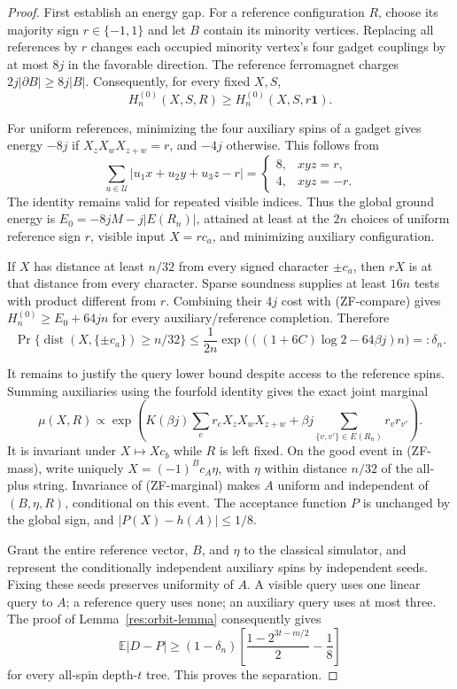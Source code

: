 \begin{proof}
First establish an energy gap.  For a reference configuration $R$,
choose its majority sign $r\in\{-1,1\}$ and let $B$ contain its
minority vertices.  Replacing all references by $r$ changes each
occupied minority vertex's four gadget couplings by at most $8j$ in
the favorable direction.  The reference ferromagnet charges
$2j|\partial B|\ge8j|B|$.  Consequently, for every fixed $X,S$,
\[
 H^{(0)}_n(X,S,R)\ge H^{(0)}_n(X,S,r\mathbf1).
 \tag{ZF-compare}
\]

For uniform references, minimizing the four auxiliary spins of a
gadget gives energy $-8j$ if $X_zX_wX_{z+w}=r$, and $-4j$ otherwise.
This follows from
\[
 \sum_{u\in\mathcal U}|u_1x+u_2y+u_3z-r|
 =\begin{cases}8,&xyz=r,\\4,&xyz=-r.\end{cases}
\]
The identity remains valid for repeated visible indices.  Thus the
global ground energy is
$E_0=-8jM-j|E(R_n)|$, attained at least at the $2n$ choices of
uniform reference sign $r$, visible input $X=r c_a$, and minimizing
auxiliary configuration.

If $X$ has distance at least $n/32$ from every signed character
$\pm c_a$, then $rX$ is at that distance from every character.
Sparse soundness supplies at least $16n$ tests with product different
from $r$.  Combining their $4j$ cost with (ZF-compare) gives
$H^{(0)}_n\ge E_0+64jn$ for every auxiliary/reference completion.
Therefore
\[
 \Pr\{\operatorname{dist}(X,\{\pm c_a\})\ge n/32\}
 \le\frac1{2n}
 \exp\bigl(((1+6C)\log2-64\beta j)n\bigr)=:\delta_n.
 \tag{ZF-mass}
\]

It remains to justify the query lower bound despite access to the
reference spins.  Summing auxiliaries using the fourfold identity
gives the exact joint marginal
\[
 \mu(X,R)\propto
 \exp\left(K(\beta j)\sum_e r_eX_zX_wX_{z+w}
       +\beta j\sum_{\{v,v'\}\in E(R_n)}r_vr_{v'}\right).
 \tag{ZF-marginal}
\]
It is invariant under $X\mapsto Xc_b$ while $R$ is left fixed.
On the good event in (ZF-mass), write uniquely
$X=(-1)^B c_A\eta$, with $\eta$ within distance $n/32$ of the
all-plus string.  Invariance of (ZF-marginal) makes $A$ uniform and
independent of $(B,\eta,R)$, conditional on this event.  The acceptance
function $P$ is unchanged by the global sign, and
$|P(X)-h(A)|\le1/8$.

Grant the entire reference vector, $B$, and $\eta$ to the classical
simulator, and represent the conditionally independent auxiliary
spins by independent seeds.  Fixing these seeds preserves uniformity
of $A$.  A visible query uses one linear query to $A$; a reference
query uses none; an auxiliary query uses at most three.  The proof of
Lemma~\ref{res:orbit-lemma} consequently gives
\[
 \mathbb E|D-P|\ge
 (1-\delta_n)\left[\frac{1-2^{3t-m/2}}2-\frac18\right]
\]
for every all-spin depth-$t$ tree.  This proves the separation.


\end{proof}
